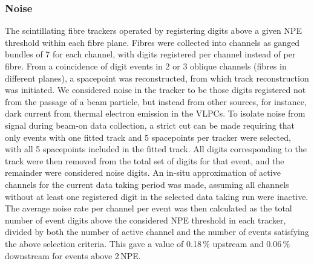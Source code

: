 \subsubsection{Noise}
The scintillating fibre trackers operated by registering digits above a given NPE threshold within each fibre plane. Fibres were collected into channels as ganged bundles of 7 for each channel, with digits registered per channel instead of per fibre. From a coincidence of digit events in 2 or 3 oblique channels (fibres in different planes), a spacepoint was reconstructed, from which track reconstruction was initiated. We considered noise in the tracker to be those digits registered not from the passage of a beam particle, but instead from other sources, for instance, dark current from thermal electron emission in the VLPCs. To isolate noise from signal during beam-on data collection, a strict cut can be made requiring that only events with one fitted track and 5 spacepoints per tracker were selected, with all 5 spacepoints included in the fitted track. All digits corresponding to the track were then removed from the total set of digits for that event, and the remainder were considered noise digits. An in-situ approximation of active channels for the current data taking period was made, assuming all channels without at least one registered digit in the selected data taking run were inactive. The average noise rate per channel per event was then calculated as the total number of event digits above the considered NPE threshold in each tracker, divided by both the number of active channel and the number of events satisfying the above selection criteria. This gave a value of 0.18\,\% upstream and 0.06\,\% downstream for events above 2\,NPE. 

